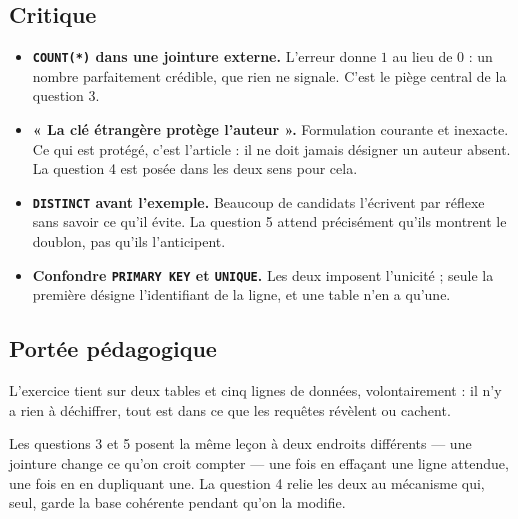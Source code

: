\subsection*{Critique}

\begin{itemize}
  \item \textbf{\lstinline{COUNT(*)} dans une jointure externe.} L'erreur donne
    $1$ au lieu de $0$ : un nombre parfaitement crédible, que rien ne signale.
    C'est le piège central de la question 3.
  \item \textbf{« La clé étrangère protège l'auteur ».} Formulation courante et
    inexacte. Ce qui est protégé, c'est l'article : il ne doit jamais désigner
    un auteur absent. La question 4 est posée dans les deux sens pour cela.
  \item \textbf{\lstinline{DISTINCT} avant l'exemple.} Beaucoup de candidats
    l'écrivent par réflexe sans savoir ce qu'il évite. La question 5 attend
    précisément qu'ils montrent le doublon, pas qu'ils l'anticipent.
  \item \textbf{Confondre \lstinline{PRIMARY KEY} et \lstinline{UNIQUE}.} Les
    deux imposent l'unicité ; seule la première désigne l'identifiant de la
    ligne, et une table n'en a qu'une.
\end{itemize}

\subsection*{Portée pédagogique}

L'exercice tient sur deux tables et cinq lignes de données, volontairement : il
n'y a rien à déchiffrer, tout est dans ce que les requêtes révèlent ou cachent.

Les questions 3 et 5 posent la même leçon à deux endroits différents — une
jointure change ce qu'on croit compter — une fois en effaçant une ligne
attendue, une fois en en dupliquant une. La question 4 relie les deux au
mécanisme qui, seul, garde la base cohérente pendant qu'on la modifie.
